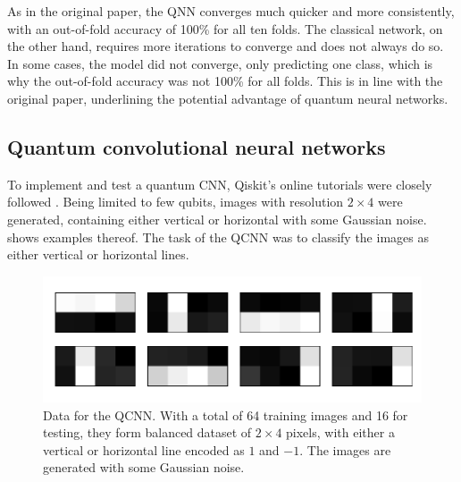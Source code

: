 As in the original paper, the QNN converges much quicker and more consistently, with an out-of-fold accuracy of 100\% for all ten folds.
The classical network, on the other hand, requires more iterations to converge and does not always do so.
In some cases, the model did not converge, only predicting one class, which is why the out-of-fold accuracy was not 100\% for all folds.
This is in line with the original paper, underlining the potential advantage of quantum neural networks.


\subsection{Quantum convolutional neural networks}
\label{sec:qcnn}

To implement and test a quantum CNN, Qiskit's online tutorials were closely followed \cite{qiskit_qcnn}.
Being limited to few qubits, images with resolution $2\times4$ were generated, containing either vertical or horizontal with some Gaussian noise.
 shows examples thereof.
The task of the QCNN was to classify the images as either vertical or horizontal lines.

\begin{figure}
    \centering
    \includegraphics[width=\textwidth]{../code/qcnn/data.pdf}
    \caption{
        Data for the QCNN.
        With a total of 64 training images and 16 for testing, they form balanced dataset of $2\times4$ pixels, with either a vertical or horizontal line encoded as $1$ and $-1$.
        The images are generated with some Gaussian noise.
    }
    \label{fig:qcnn_data}
\end{figure}



